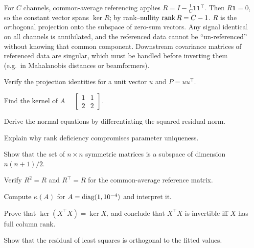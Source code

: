 \begin{workedexample}
For $C$ channels, common-average referencing applies $R=I-\frac1C\mathbf 1\mathbf 1^\top$. Then $R\mathbf 1=0$, so the constant vector spans $\ker R$; by rank--nullity $\operatorname{rank} R=C-1$. $R$ is the orthogonal projection onto the subspace of zero-sum vectors. Any signal identical on all channels is annihilated, and the referenced data cannot be ``un-referenced'' without knowing that common component. Downstream covariance matrices of referenced data are singular, which must be handled before inverting them (e.g.\ in Mahalanobis distances or beamformers).
\end{workedexample}
\begin{exercises}
\item Verify the projection identities for a unit vector $u$ and $P=uu^\top$.
\item Find the kernel of $A=\begin{bmatrix}1&1\\2&2\end{bmatrix}$.
\item Derive the normal equations by differentiating the squared residual norm.
\item Explain why rank deficiency compromises parameter uniqueness.
\item Show that the set of $n\times n$ symmetric matrices is a subspace of dimension $n(n+1)/2$.
\item Verify $R^2=R$ and $R^\top=R$ for the common-average reference matrix.
\item Compute $\kappa(A)$ for $A=\operatorname{diag}(1,10^{-4})$ and interpret it.
\item Prove that $\ker(X^\top X)=\ker X$, and conclude that $X^\top X$ is invertible iff $X$ has full column rank.
\item Show that the residual of least squares is orthogonal to the fitted values.
\end{exercises}
